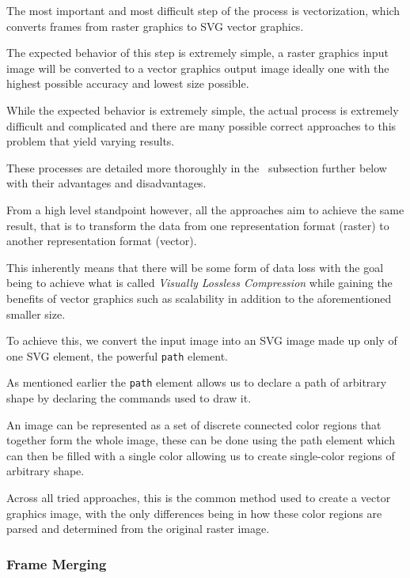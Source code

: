 \documentclass[12pt]{article}
\newcommand{\sentence}{} %
\newcommand{\italic}[1]{\textit{#1}}
\newcommand{\code}[1]{\texttt{#1}}
\begin{document}
    \tab
    The most important and most difficult step of the process is vectorization, which converts
    frames from raster graphics to SVG vector graphics.
    \sentence
    The expected behavior of this step is extremely simple, a raster graphics input image will be converted to a
    vector graphics output image ideally one with the highest possible accuracy and lowest size possible.
    \sentence
    While the expected behavior is extremely simple, the actual process is extremely difficult and complicated and
    there are many possible correct approaches to this problem that yield varying results.
    \sentence
    These processes are detailed more thoroughly in the~ subsection further below
    with their advantages and disadvantages.
    \sentence
    From a high level standpoint however, all the approaches aim to achieve the same result, that is to transform the
    data from one representation format (raster) to another representation format (vector).
    \sentence
    This inherently means that there will be some form of data loss with the goal being to achieve what is called
    \italic{Visually Lossless Compression} while gaining the benefits of vector graphics such as scalability in
    addition to the aforementioned smaller size.
    \sentence
    To achieve this, we convert the input image into an SVG image made up only of one SVG element, the powerful
    \code{path} element.
    \sentence
    As mentioned earlier the \code{path} element allows us to declare a path of arbitrary shape by declaring the
    commands used to draw it.
    \sentence
    An image can be represented as a set of discrete connected color regions that together form the whole image,
    these can be done using the path element which can then be filled with a single color allowing us to create
    single-color regions of arbitrary shape.
    \sentence
    Across all tried approaches, this is the common method used to create a vector graphics image, with the only
    differences being in how these color regions are parsed and determined from the original raster image.


    \subsubsection{Frame Merging}\label{subsubsec:frame-merging}
\end{document}
